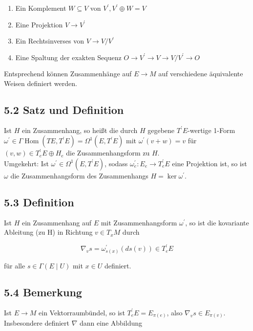 \documentclass[10pt, letterpaper]{article}
\begin{document}
\begin{enumerate}
  \item Ein Komplement $W \subseteq V$ von $V^{\prime}, V^{\prime} \oplus W=V$
  \item Eine Projektion $V \rightarrow V^{\prime}$
  \item Ein Rechtsinverses von $V \rightarrow V / V^{\prime}$
  \item Eine Spaltung der exakten Sequenz $O \rightarrow V^{\prime} \rightarrow V \rightarrow V / V^{\prime} \rightarrow O$
\end{enumerate}

Entsprechend können Zusammenhänge auf $E \rightarrow M$ auf verschiedene äquivalente Weisen definiert werden.

\subsection*{5.2 Satz und Definition}
Ist $H$ ein Zusammenhang, so heißt die durch $H$ gegebene $T^{\prime} E$-wertige 1-Form $\omega^{\prime} \in \Gamma \operatorname{Hom}\left(T E, T^{\prime} E\right)=\Omega^{1}\left(E, T^{\prime} E\right)$ mit $\omega^{\prime}(v+w)=v$ für $(v, w) \in T_{e}^{\prime} E \oplus H_{e}$ die Zusammenhangsform zu $H$.\\
Umgekehrt: Ist $\omega^{\prime} \in \Omega^{1}\left(E, T^{\prime} E\right)$, sodass $\omega_{e}^{\prime}: E_{e} \rightarrow T_{e}^{\prime} E$ eine Projektion ist, so ist $\omega$ die Zusammenhangsform des Zusammenhangs $H=\operatorname{ker} \omega^{\prime}$.

\subsection*{5.3 Definition}
Ist $H$ ein Zusammenhang auf $E$ mit Zusammenhangsform $\omega^{\prime}$, so ist die kovariante Ableitung (zu H) in Richtung $v \in T_{x} M$ durch

$$
\nabla_{v} s=\omega_{s(x)}^{\prime}(d s(v)) \in T_{e}^{\prime} E
$$

für alle $s \in \Gamma(E \mid U)$ mit $x \in U$ definiert.

\subsection*{5.4 Bemerkung}
Ist $E \rightarrow M$ ein Vektorraumbündel, so ist $T_{e}^{\prime} E=E_{\pi(e)}$, also $\nabla_{v} s \in E_{\pi(v)}$. Insbesondere definiert $\nabla$ dann eine Abbildung
\end{document}
